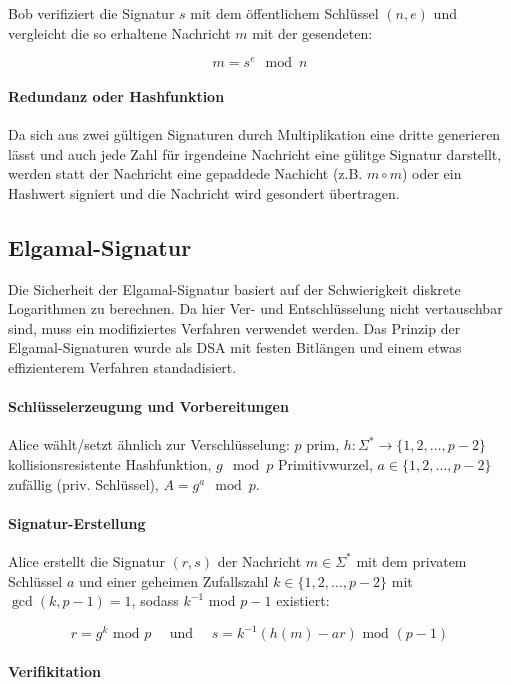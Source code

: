 \documentclass[a4paper,12pt,oneside]{scrreprt}
\begin{document}
Bob verifiziert die Signatur $s$ mit dem öffentlichem Schlüssel $(n,e)$ und vergleicht die so erhaltene
Nachricht $m$ mit der gesendeten:

\[ m = s^e \mod n \]

\paragraph{Redundanz oder Hashfunktion}

Da sich aus zwei gültigen Signaturen durch Multiplikation eine dritte generieren lässt und auch
jede Zahl für irgendeine Nachricht eine gülitge Signatur darstellt, werden statt der Nachricht
eine gepaddede Nachicht (z.B. $m \circ m$) oder ein Hashwert signiert und die Nachricht wird gesondert
übertragen.  

\subsection*{Elgamal-Signatur}

Die Sicherheit der Elgamal-Signatur basiert auf der Schwierigkeit diskrete Logarithmen zu berechnen. 
Da hier Ver- und Entschlüsselung nicht vertauschbar sind, muss ein modifiziertes Verfahren verwendet
werden. Das Prinzip der Elgamal-Signaturen wurde als DSA mit festen Bitlängen und einem 
etwas effizienterem Verfahren standadisiert. 

\paragraph{Schlüsselerzeugung und Vorbereitungen}

Alice wählt/setzt ähnlich zur Verschlüsselung: $p$ prim, $h : \Sigma^* \to \{1,2,\dots,p-2\}$ 
kollisionsresistente Hashfunktion, $g \mod p$ Primitivwurzel, 
$a \in \{1,2,\dots,p-2\}$ zufällig (priv. Schlüssel), $A = g^a \mod p$.

\paragraph{Signatur-Erstellung}

Alice erstellt die Signatur $(r,s)$ der Nachricht $m \in \Sigma^*$ mit dem privatem Schlüssel $a$ 
und einer geheimen Zufallszahl $k \in \{1,2,\dots,p-2\}$ mit $\gcd(k,p-1) = 1$, sodass
$k^{-1}$ mod $p-1$ existiert:

\[ r = g^k \text{ mod } p \text{~~~~und~~~~} s = k^{-1}(h(m)-ar) \text{ mod } (p-1)\]

\paragraph{Verifikitation}
\end{document}
